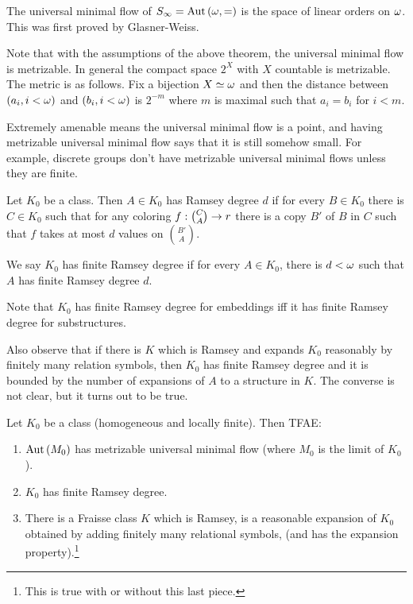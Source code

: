 \documentclass{amsart}
\begin{document}
\begin{exm}
The universal minimal flow of $S_\infty = \operatorname{Aut}\left( \omega , = \right)$ is the space of
linear orders on $\omega$.
This was first proved by Glasner-Weiss.
\end{exm}

Note that with the assumptions of the above theorem, the universal minimal flow is
metrizable. In general the compact space $2^{X}$ with $X$ countable is metrizable.
The metric is as follows.
Fix a bijection $X\simeq \omega$ and then the distance between $\left( a_i , i < \omega \right)$
and $\left( b_i, i < \omega \right)$ is $2^{-m}$ where $m$ is maximal such that $a_i = b_i$
for $i < m$.

Extremely amenable means the universal minimal flow is a point, and having metrizable
universal minimal flow says that it is still somehow small.
For example, discrete groups don't have metrizable universal minimal flows unless they are finite.

\begin{defn}
Let $K_0$ be a \Fraisse class. 
Then $A\in K_0$ has Ramsey degree $d$ if 
for every $B\in K_0$
there is $C\in K_0$
such that for any coloring
$f:\binom{C}{A} \rightarrow r$ there is a copy $B'$ of $B$ in $C$ such that $f$ takes at most
$d$ values on $\binom{B'}{A}$. 

We say $K_0$ has finite Ramsey degree if for every $A\in K_0$, there is $d<\omega$ such that $A$ has
finite Ramsey degree $d$.
\end{defn}

Note that $K_0$ has finite Ramsey degree for embeddings iff it has finite Ramsey degree
for substructures.

Also observe that if there is $K$ which is Ramsey and expands $K_0$ reasonably by finitely many relation
symbols, then $K_0$ has finite Ramsey degree and it is bounded by the number
of expansions of $A$ to a structure in $K$.
The converse is not clear, but it turns out to be true.

\begin{thm}[Zucker]
Let $K_0$ be a \Fraisse class (homogeneous and locally finite). Then TFAE:
\begin{enumerate}[label = (\iii)]
\item $\operatorname{Aut}\left( M_0 \right)$ has metrizable universal minimal flow (where $M_0$ is the
\Fraisse limit of $K_0$).
\item $K_0$ has finite Ramsey degree.
\item There is a Fraisse class $K$ which is Ramsey, is a reasonable expansion of $K_0$ obtained by
adding finitely many relational symbols, (and has the expansion property).\footnote{This
is true with or without this last piece.}
\end{enumerate}
\end{thm}
\end{document}
